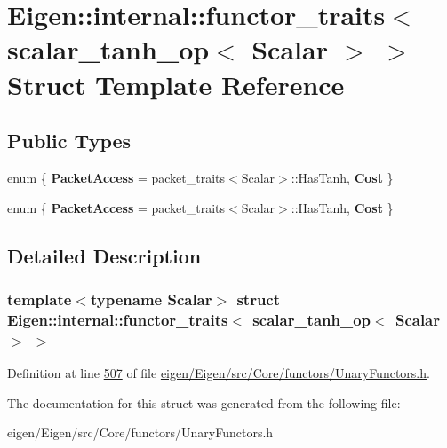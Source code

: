 \hypertarget{struct_eigen_1_1internal_1_1functor__traits_3_01scalar__tanh__op_3_01_scalar_01_4_01_4}{}\section{Eigen\+:\+:internal\+:\+:functor\+\_\+traits$<$ scalar\+\_\+tanh\+\_\+op$<$ Scalar $>$ $>$ Struct Template Reference}
\label{struct_eigen_1_1internal_1_1functor__traits_3_01scalar__tanh__op_3_01_scalar_01_4_01_4}
\subsection*{Public Types}
\begin{DoxyCompactItemize}
\item 
\mbox{\label{struct_eigen_1_1internal_1_1functor__traits_3_01scalar__tanh__op_3_01_scalar_01_4_01_4_a062d79d8029a7c42d8f795fca81e5440}} 
enum \{ {\bfseries Packet\+Access} = packet\+\_\+traits$<$Scalar$>$\+:\+:Has\+Tanh, 
{\bfseries Cost}
 \}
\item 
\mbox{\label{struct_eigen_1_1internal_1_1functor__traits_3_01scalar__tanh__op_3_01_scalar_01_4_01_4_a1387ea32f9a261285f2f6a77f4d3ac6d}} 
enum \{ {\bfseries Packet\+Access} = packet\+\_\+traits$<$Scalar$>$\+:\+:Has\+Tanh, 
{\bfseries Cost}
 \}
\end{DoxyCompactItemize}


\subsection{Detailed Description}
\subsubsection*{template$<$typename Scalar$>$\newline
struct Eigen\+::internal\+::functor\+\_\+traits$<$ scalar\+\_\+tanh\+\_\+op$<$ Scalar $>$ $>$}



Definition at line \hyperlink{eigen_2_eigen_2src_2_core_2functors_2_unary_functors_8h_source_l00507}{507} of file \hyperlink{eigen_2_eigen_2src_2_core_2functors_2_unary_functors_8h_source}{eigen/\+Eigen/src/\+Core/functors/\+Unary\+Functors.\+h}.



The documentation for this struct was generated from the following file\+:\begin{DoxyCompactItemize}
\item 
eigen/\+Eigen/src/\+Core/functors/\+Unary\+Functors.\+h\end{DoxyCompactItemize}
